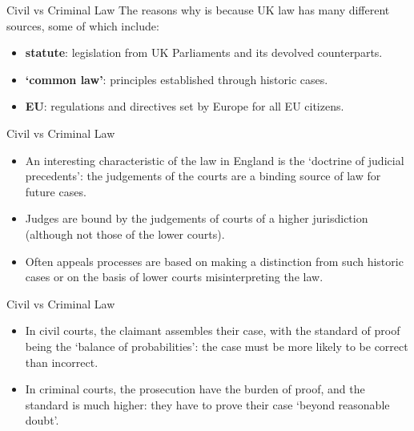 \begin{frame}{Civil vs Criminal Law}
The reasons why is because UK law has many different sources, some of which include:

	\begin{itemize}
		\item \textbf{statute}: legislation from UK Parliaments and its devolved counterparts.
		\vspace{1ex}
		\item \textbf{`common law'}: principles established through historic cases.
		\vspace{1ex}
		\item \textbf{EU}: regulations and directives set by Europe for all EU citizens.
	\end{itemize}
\end{frame}

\begin{frame}{Civil vs Criminal Law}
	\begin{itemize}
		\item An interesting characteristic of the law in England is the `doctrine of judicial precedents': the judgements of the 
		courts are a binding source of law for future cases. 
		\vspace{1ex}
		\item Judges are bound by the judgements of courts of a higher jurisdiction (although not those of the lower courts).
		\vspace{1ex}
		\item Often appeals processes are based on making a distinction from such historic cases or on the basis of lower courts misinterpreting the law.
	\end{itemize}
\end{frame}

\begin{frame}{Civil vs Criminal Law}
	\begin{itemize}
		\item In civil courts, the claimant assembles their case, with the standard of proof being the ‘balance of probabilities’: the case must be more likely
		to be correct than incorrect.
		\vspace{2ex}
		\item In criminal courts, the prosecution have the burden of proof, and the standard is much higher: they have to prove their 
		case `beyond reasonable doubt'.
	\end{itemize}
\end{frame}

